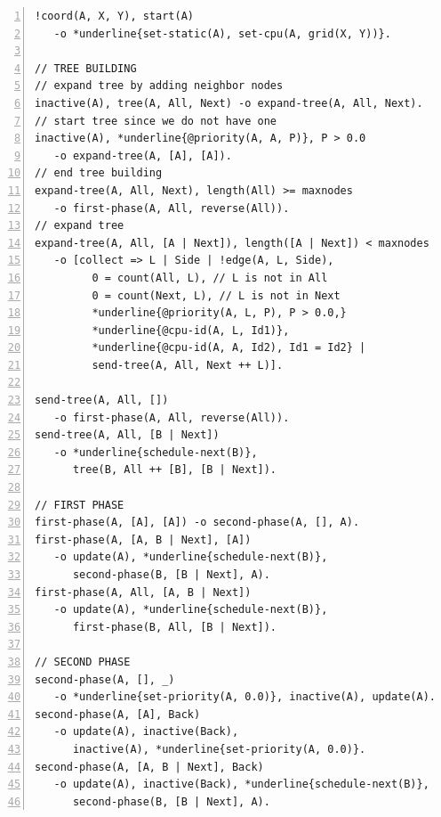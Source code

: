 \begin{topfig}
\scriptsize\begin{Verbatim}[numbers=left,commandchars=*\{\}]
!coord(A, X, Y), start(A)
   -o *underline{set-static(A), set-cpu(A, grid(X, Y))}.

// TREE BUILDING
// expand tree by adding neighbor nodes
inactive(A), tree(A, All, Next) -o expand-tree(A, All, Next).
// start tree since we do not have one
inactive(A), *underline{@priority(A, A, P)}, P > 0.0
   -o expand-tree(A, [A], [A]).
// end tree building
expand-tree(A, All, Next), length(All) >= maxnodes
   -o first-phase(A, All, reverse(All)).
// expand tree
expand-tree(A, All, [A | Next]), length([A | Next]) < maxnodes
   -o [collect => L | Side | !edge(A, L, Side),
         0 = count(All, L), // L is not in All
         0 = count(Next, L), // L is not in Next
         *underline{@priority(A, L, P), P > 0.0,}
         *underline{@cpu-id(A, L, Id1)},
         *underline{@cpu-id(A, A, Id2), Id1 = Id2} |
         send-tree(A, All, Next ++ L)].

send-tree(A, All, [])
   -o first-phase(A, All, reverse(All)).
send-tree(A, All, [B | Next])
   -o *underline{schedule-next(B)},
      tree(B, All ++ [B], [B | Next]).

// FIRST PHASE
first-phase(A, [A], [A]) -o second-phase(A, [], A).
first-phase(A, [A, B | Next], [A])
   -o update(A), *underline{schedule-next(B)},
      second-phase(B, [B | Next], A).
first-phase(A, All, [A, B | Next])
   -o update(A), *underline{schedule-next(B)},
      first-phase(B, All, [B | Next]).

// SECOND PHASE
second-phase(A, [], _)
   -o *underline{set-priority(A, 0.0)}, inactive(A), update(A).
second-phase(A, [A], Back)
   -o update(A), inactive(Back),
      inactive(A), *underline{set-priority(A, 0.0)}.
second-phase(A, [A, B | Next], Back)
   -o update(A), inactive(Back), *underline{schedule-next(B)},
      second-phase(B, [B | Next], A).
\end{Verbatim}
\end{topfig}
\normalsize

